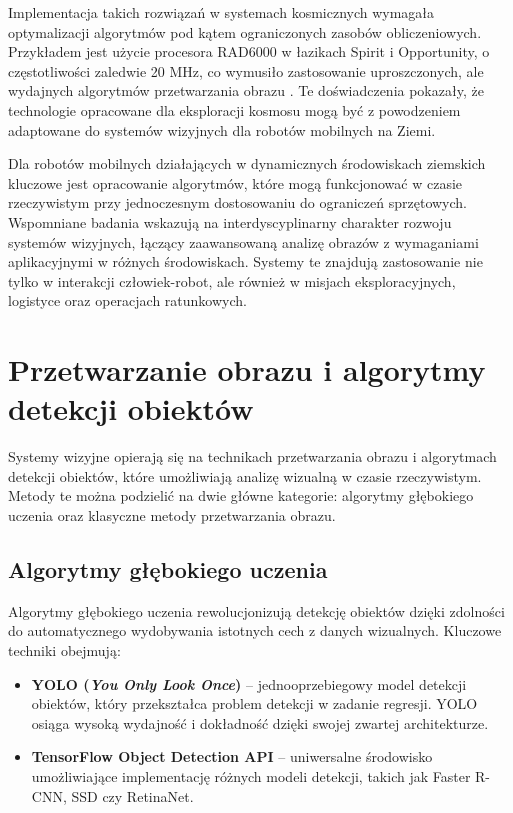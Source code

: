 \documentclass[a4paper,twoside,12pt]{book}
\begin{document}
Implementacja takich rozwiązań w systemach kosmicznych wymagała optymalizacji algorytmów pod kątem ograniczonych zasobów obliczeniowych. Przykładem jest użycie procesora RAD6000 w łazikach Spirit i Opportunity, o częstotliwości zaledwie 20 MHz, co wymusiło zastosowanie uproszczonych, ale wydajnych algorytmów przetwarzania obrazu \cite{bib:matthies2007mars}. Te doświadczenia pokazały, że technologie opracowane dla eksploracji kosmosu mogą być z powodzeniem adaptowane do systemów wizyjnych dla robotów mobilnych na Ziemi.

Dla robotów mobilnych działających w dynamicznych środowiskach ziemskich kluczowe jest opracowanie algorytmów, które mogą funkcjonować w czasie rzeczywistym przy jednoczesnym dostosowaniu do ograniczeń sprzętowych. Wspomniane badania \cite{bib:aoki2001realtime} \cite{bib:matthies2007mars} wskazują na interdyscyplinarny charakter rozwoju systemów wizyjnych, łączący zaawansowaną analizę obrazów z wymaganiami aplikacyjnymi w różnych środowiskach. Systemy te znajdują zastosowanie nie tylko w interakcji człowiek-robot, ale również w misjach eksploracyjnych, logistyce oraz operacjach ratunkowych.


\section{Przetwarzanie obrazu i algorytmy detekcji obiektów}
Systemy wizyjne opierają się na technikach przetwarzania obrazu i algorytmach detekcji obiektów, które umożliwiają analizę wizualną w czasie rzeczywistym. Metody te można podzielić na dwie główne kategorie: algorytmy głębokiego uczenia oraz klasyczne metody przetwarzania obrazu.

\subsection{Algorytmy głębokiego uczenia}
Algorytmy głębokiego uczenia rewolucjonizują detekcję obiektów dzięki zdolności do automatycznego wydobywania istotnych cech z danych wizualnych. Kluczowe techniki obejmują:
\begin{itemize}
    \item \textbf{YOLO (\textit{You Only Look Once})} – jednooprzebiegowy model detekcji obiektów, który przekształca problem detekcji w zadanie regresji. YOLO osiąga wysoką wydajność i dokładność dzięki swojej zwartej architekturze.
    \item \textbf{TensorFlow Object Detection API} – uniwersalne środowisko umożliwiające implementację różnych modeli detekcji, takich jak Faster R-CNN, SSD czy RetinaNet.
\end{itemize}
\end{document}
